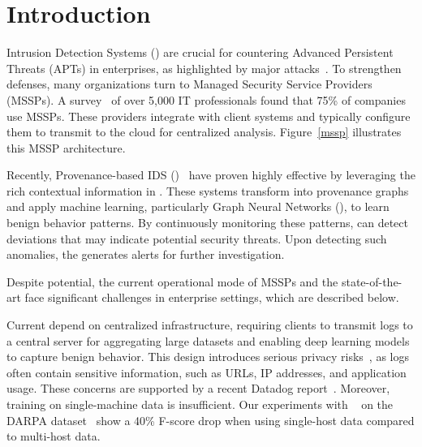 \section{Introduction}
\label{s:intro}

Intrusion Detection Systems (\ids) are crucial for countering Advanced Persistent Threats (APTs) in enterprises, as highlighted by major attacks~\cite{solarwinds,notpetya}. To strengthen defenses, many organizations turn to Managed Security Service Providers (MSSPs). A survey~\cite{msspsurvey} of over 5,000 IT professionals found that 75\% of companies use MSSPs. These providers integrate with client systems and typically configure them to transmit \logs to the cloud for centralized analysis. Figure~\ref{mssp} illustrates this MSSP architecture.



Recently, Provenance-based IDS (\pids)~\cite{streamspot,provdetector2020,wang2022threatrace,shadewatcher,yangprographer,han2020unicorn,jia2023magic,flash2024,cheng2023kairos,sigl} have proven highly effective by leveraging the rich contextual information in \logs. These systems transform \logs into provenance graphs and apply machine learning, particularly Graph Neural Networks (\gnnshort), to learn benign behavior patterns. By continuously monitoring these patterns, \pids can detect deviations that may indicate potential security threats. Upon detecting such anomalies, the \pids generates alerts for further investigation.


\smallskip
{}
\smallskip

\noindent
Despite \pids potential, the current operational mode of MSSPs and the state-of-the-art \pids face significant challenges in enterprise settings, which are described below.

 Current \pids depend on centralized infrastructure, requiring clients to transmit logs to a central server for aggregating large datasets and enabling deep learning models to capture benign behavior. This design introduces serious privacy risks~\cite{aghili2024empirical,ghiasvand2019anonymization,slagell2006flaim}, as logs often contain sensitive information, such as URLs, IP addresses, and application usage. These concerns are supported by a recent Datadog report~\cite{datadog}. Moreover, training on single-machine data is insufficient. Our experiments with \flash~\cite{flash2024} on the DARPA \optc dataset~\cite{darpaoptc} show a 40\% F-score drop when using single-host data compared to multi-host data.

